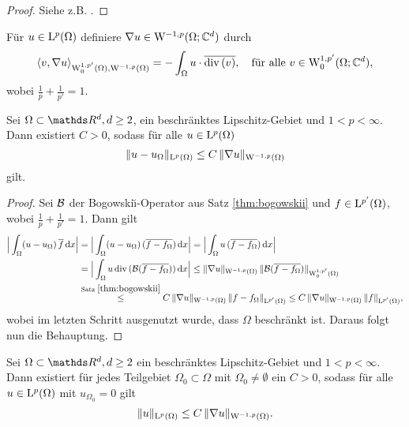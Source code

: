 \begin{proof}
  Siehe z.B. \cite[Seiten 161-172]{galdi}.
\end{proof}

Für $u \in \mathrm{L}^p(\Omega)$ definiere $\nabla u \in \mathrm{W}^{-1,p}(\Omega; \mathbb{C}^d)$ durch
$$
\langle v, \nabla u\rangle_{\mathrm{W}_0^{1,p'}(\Omega), \mathrm{W}^{-1,p}(\Omega)}
= -\int_\Omega u \cdot \overline{\mathrm{div\,} (v)}, \quad\text{für alle } v \in \mathrm{W}^{1,p'}_0(\Omega; \mathbb{C}^d),
$$
wobei $\frac{1}{p} + \frac{1}{p'} = 1$.

\begin{lem}
  \label{lem:poincare}
  Sei $\Omega \subset \R^d, d \geq 2$, ein beschränktes Lipschitz-Gebiet und $1 < p< \infty$.
  Dann existiert $C > 0$, sodass für alle $u \in \mathrm{L}^p(\Omega)$
  $$
  \| u - u_\Omega\|_{\mathrm{L}^p(\Omega)} \leq C\, \| \nabla u\|_{\mathrm{W}^{-1,p}(\Omega)}
  $$
  gilt.
\end{lem}

\begin{proof}
  Sei $\mathcal{B}$ der Bogowski\u{\i}-Operator aus Satz \ref{thm:bogowskii} und $f \in \mathrm{L}^{p'}(\Omega)$, wobei $\frac{1}{p} + \frac{1}{p'} = 1$.
  Dann gilt
  \begin{align*}
  \Big| \int_\Omega (u - u_\Omega) \, \overline f \, {\operatorname{d}\!{x}} \Big|
    &= \Big| \int_\Omega (u - u_\Omega) \, (\overline{f - f_\Omega})  \, {\operatorname{d}\!{x}} \Big|
    = \Big| \int_\Omega u \, (\overline{f - f_\Omega}) \, {\operatorname{d}\!{x}} \Big| \\
    &= \Big| \int_\Omega u \, \mathrm{div\,} ( \mathcal{B}(\overline{f - f_\Omega}) ) \, {\operatorname{d}\!{x}} \Big|
    \leq \|\nabla u\|_{\mathrm{W}^{-1,p}(\Omega)} \, \|\mathcal{B}(\overline{f - f_\Omega}) \|_{\mathrm{W}_0^{1,p'}(\Omega)} \\
    &\overset{\text{Satz } \ref{thm:bogowskii}}{\leq}  C \,  \|\nabla u\|_{\mathrm{W}^{-1,p}(\Omega)} \, \|f - f_\Omega\|_{\mathrm{L}^{p'}(\Omega)}
    \leq C \, \|\nabla u\|_{\mathrm{W}^{-1,p}(\Omega)} \, \|f\|_{\mathrm{L}^{p'}(\Omega)},
  \end{align*}
  wobei im letzten Schritt ausgenutzt wurde, dass $\Omega$ beschränkt ist.
  Daraus folgt nun die Behauptung.
\end{proof}

\begin{lem}
  \label{lem:poincare2}
  Sei $\Omega \subset \R^d, d\geq 2$ ein beschränktes Lipschitz-Gebiet und $1 < p < \infty$.
  Dann existiert für jedes Teilgebiet $\Omega_0 \subset \Omega$ mit $\Omega_0 \neq \emptyset$ ein $C > 0$, sodass für alle $u \in \mathrm{L}^p(\Omega)$ mit $u_{\Omega_0} = 0$ gilt
  $$
  \|u \|_{\mathrm{L}^p(\Omega)} \leq C \, \| \nabla u \|_{\mathrm{W}^{-1,p}(\Omega)}.
  $$
\end{lem}

